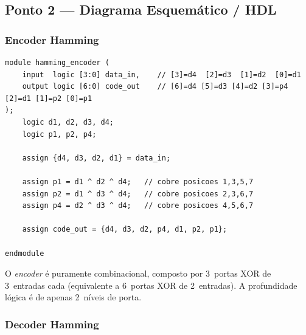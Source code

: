 \documentclass[12pt,a4paper]{article}
\begin{document}
\subsection{Ponto 2 --- Diagrama Esquemático / HDL}

\subsubsection{Encoder Hamming}

\begin{lstlisting}[style=svstyle,caption={hamming\_encoder.sv --- Codificador combinacional 4$\to$7 bits},label=lst:encoder]
module hamming_encoder (
    input  logic [3:0] data_in,    // [3]=d4  [2]=d3  [1]=d2  [0]=d1
    output logic [6:0] code_out    // [6]=d4 [5]=d3 [4]=d2 [3]=p4 [2]=d1 [1]=p2 [0]=p1
);
    logic d1, d2, d3, d4;
    logic p1, p2, p4;

    assign {d4, d3, d2, d1} = data_in;

    assign p1 = d1 ^ d2 ^ d4;   // cobre posicoes 1,3,5,7
    assign p2 = d1 ^ d3 ^ d4;   // cobre posicoes 2,3,6,7
    assign p4 = d2 ^ d3 ^ d4;   // cobre posicoes 4,5,6,7

    assign code_out = {d4, d3, d2, p4, d1, p2, p1};

endmodule
\end{lstlisting}

O \textit{encoder} é puramente combinacional, composto por 3~portas XOR de 3~entradas cada (equivalente a 6~portas XOR de 2~entradas). A profundidade lógica é de apenas 2~níveis de porta.

\subsubsection{Decoder Hamming}
\end{document}
